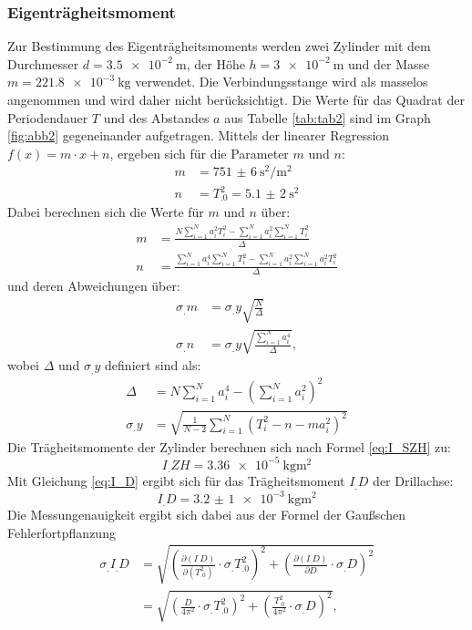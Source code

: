 \subsubsection{Eigenträgheitsmoment}\label{subsubsec:I_D}
Zur Bestimmung des Eigenträgheitsmoments werden zwei Zylinder mit dem Durchmesser $d = \SI{3,5e-2}{\metre}$, der Höhe $h = \SI{3e-2}{\metre}$ und der Masse $m = \SI{221,8e-3}{\kilogram}$ verwendet.\newline
Die Verbindungsstange wird als masselos angenommen und wird daher nicht berücksichtigt.
Die Werte für das Quadrat der Periodendauer $T$ und des Abstandes $a$ aus Tabelle \ref{tab:tab2} sind im Graph \ref{fig:abb2} gegeneinander aufgetragen. Mittels der linearer Regression $f(x) = m \cdot x + n$, ergeben sich für die Parameter $m$ und $n$:
\begin{align*}
m 	&= \SI{751(6)}{\second\squared\per\metre\squared} \\
n 	&= T_.0^2 = \SI{5,1(2)}{\second\squared}
\end{align*}
Dabei berechnen sich die Werte für $m$ und $n$ über:
\begin{align*}
m 	&= \frac{N\sum_{i=1}^N a_i^2 T_i^2 -\sum_{i=1}^N a_i^2 \sum_{i=1}^N T_i^2}{\Delta}\\
n 	&= \frac{\sum_{i=1}^N a_i^4 \sum_{i=1}^N T_i^2 -\sum_{i=1}^N a_i^2 \sum_{i=1}^N a_i^2 T_i^2}{\Delta}
\end{align*}
und deren Abweichungen über:
\begin{align*}
\sigma_.m 	&= \sigma_.y\sqrt{\frac{N}{\Delta}}\\
\sigma_.n 	&= \sigma_.y\sqrt{\frac{\sum_{i=1}^N a_i^4}{\Delta}},
\end{align*}
wobei $\Delta$ und $\sigma_.y$ definiert sind als:
\begin{align*}
\Delta 		&= N\sum_{i=1}^N a_i^4 -\left(\sum_{i=1}^N a_i^2\right)^2\\
\sigma_.y 	&= \sqrt{\frac{1}{N-2}\sum_{i=1}^N \left(T_i^2-n-ma_i^2\right)^2}
\end{align*}
Die Trägheitsmomente der Zylinder berechnen sich nach Formel \eqref{eq:I_SZH} zu:
\[I_.{ZH}=\SI{3,36e-5}{\kilogram\metre\squared}\]
Mit Gleichung \eqref{eq:I_D} ergibt sich für das Trägheitsmoment $I_.D$ der Drillachse:
\[I_.D=\SI{3,2(1)e-3}{\kilogram\metre\squared}\]
Die Messungenauigkeit ergibt sich dabei aus der Formel der Gaußschen Fehlerfortpflanzung
\begin{align*}
\sigma_.{I_.D}	&= \sqrt{\left(\frac{\partial (I_.D)}{\partial (T^2_.0)} \cdot \sigma_.{T^2_.0}\right)^2+\left(\frac{\partial (I_.D)}{\partial D}\cdot\sigma_.D\right)^2}\\
				&= \sqrt{\left(\frac{D}{4\pi^2}\cdot\sigma_.{T^2_.0}\right)^2+\left(\frac{T^2_.0}{4\pi^2}\cdot\sigma_.D\right)^2},
\end{align*}
